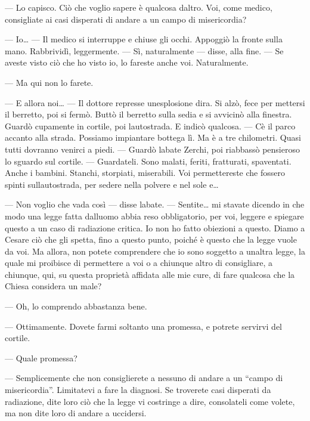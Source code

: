 --- Lo capisco. Ciò che voglio sapere è qualcosa
d\textquotesingle altro. Voi, come medico, consigliate ai casi disperati
di andare a un campo di misericordia?

--- Io\ldots{} --- Il medico si interruppe e chiuse gli occhi. Appoggiò
la fronte sulla mano. Rabbrividì, leggermente. --- Sì, naturalmente ---
disse, alla fine. --- Se aveste visto ciò che ho visto io, lo fareste
anche voi. Naturalmente.

--- Ma qui non lo farete.

--- E allora noi\ldots{} --- Il dottore represse
un\textquotesingle esplosione d\textquotesingle ira. Si alzò, fece per
mettersi il berretto, poi si fermò. Buttò il berretto sulla sedia e si
avvicinò alla finestra. Guardò cupamente in cortile, poi
l\textquotesingle autostrada. E indicò qualcosa. --- C\textquotesingle è
il parco accanto alla strada. Possiamo impiantare bottega lì. Ma è a tre
chilometri. Quasi tutti dovranno venirci a piedi. --- Guardò
l\textquotesingle abate Zerchi, poi riabbassò pensieroso lo sguardo sul
cortile. --- Guardateli. Sono malati, feriti, fratturati, spaventati.
Anche i bambini. Stanchi, storpiati, miserabili. Voi permettereste che
fossero spinti sull\textquotesingle autostrada, per sedere nella polvere
e nel sole e\ldots{}

--- Non voglio che vada così --- disse l\textquotesingle abate. ---
Sentite\ldots{} mi stavate dicendo in che modo una legge fatta
dall\textquotesingle uomo abbia reso obbligatorio, per voi, leggere e
spiegare questo a un caso di radiazione critica. Io non ho fatto
obiezioni a questo. Diamo a Cesare ciò che gli spetta, fino a questo
punto, poiché è questo che la legge vuole da voi. Ma allora, non potete
comprendere che io sono soggetto a un\textquotesingle altra legge, la
quale mi proibisce di permettere a voi o a chiunque altro di
consigliare, a chiunque, qui, su questa proprietà affidata alle mie
cure, di fare qualcosa che la Chiesa considera un male?

--- Oh, lo comprendo abbastanza bene.

--- Ottimamente. Dovete farmi soltanto una promessa, e potrete servirvi
del cortile.

--- Quale promessa?

--- Semplicemente che non consiglierete a nessuno di andare a un ``campo
di misericordia''. Limitatevi a fare la diagnosi. Se troverete casi
disperati da radiazione, dite loro ciò che la legge vi costringe a dire,
consolateli come volete, ma non dite loro di andare a uccidersi.

